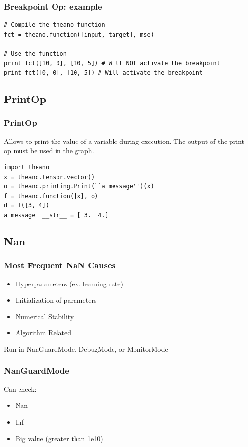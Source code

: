 \documentclass[utf8x,xcolor=pdftex,dvipsnames,table]{beamer}
\begin{document}
\begin{frame}[fragile]
  \frametitle{Breakpoint Op: example}
\begin{lstlisting}
# Compile the theano function
fct = theano.function([input, target], mse)

# Use the function
print fct([10, 0], [10, 5]) # Will NOT activate the breakpoint
print fct([0, 0], [10, 5]) # Will activate the breakpoint
\end{lstlisting}

\end{frame}

\subsection{PrintOp}
\begin{frame}[fragile]
  \frametitle{PrintOp}
Allows to print the value of a variable during execution. The output
of the print op must be used in the graph.
 \vspace{1cm}
\begin{lstlisting}
import theano
x = theano.tensor.vector()
o = theano.printing.Print(``a message'')(x)
f = theano.function([x], o)
d = f([3, 4])
a message  __str__ = [ 3.  4.]
\end{lstlisting}
\end{frame}


\subsection{Nan}
\begin{frame}
  \frametitle{Most Frequent NaN Causes}
\begin{itemize}
\item Hyperparameters (ex: learning rate)
\item Initialization of parameters
\item Numerical Stability
\item Algorithm Related
\end{itemize}
Run in NanGuardMode, DebugMode, or MonitorMode
\end{frame}

\begin{frame}[fragile]
  \frametitle{NanGuardMode}
Can check:
\begin{itemize}
\item Nan
\item Inf
\item Big value (greater than 1e10)
\end{itemize}
\end{frame}
\end{document}
